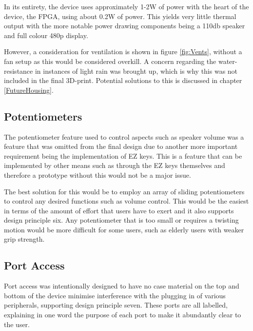 In its entirety, the device uses approximately 1-2W of power with the heart of the device, the FPGA, using about 0.2W of power.
This yields very little thermal output with the more notable power drawing components being a 110db speaker and full colour 480p display.

However, a consideration for ventilation is shown in figure \ref{fig:Vents}, without a fan setup as this would be considered overkill.
A concern regarding the water-resistance in instances of light rain was brought up, which is why this was not included in the final 3D-print.
Potential solutions to this is discussed in chapter \ref{FutureHousing}.

\subsection{Potentiometers}

The potentiometer feature used to control aspects such as speaker volume was a feature that was omitted from the final design due to another more important requirement being the implementation of EZ keys.
This is a feature that can be implemented by other means such as through the EZ keys themselves and therefore a prototype without this would not be a major issue.

The best solution for this would be to employ an array of sliding potentiometers to control any desired functions such as volume control.
This would be the easiest in terms of the amount of effort that users have to exert and it also supports design principle six.
Any potentiometer that is too small or requires a twisting motion would be more difficult for some users, such as elderly users with weaker grip strength.

\subsection{Port Access}

Port access was intentionally designed to have no case material on the top and bottom of the device minimise interference with the plugging in of various peripherals, supporting design principle seven.
These ports are all labelled, explaining in one word the purpose of each port to make it abundantly clear to the user.

